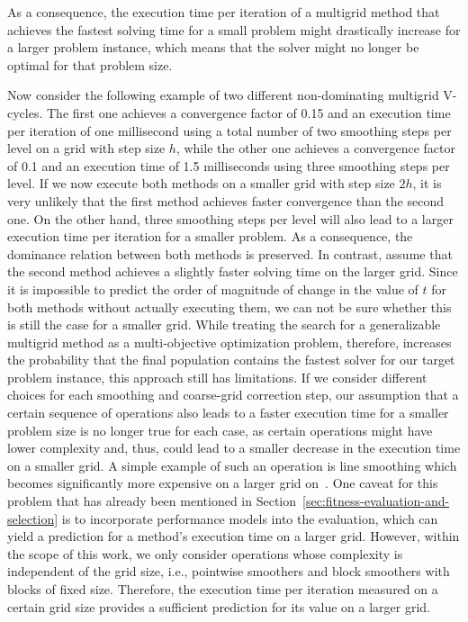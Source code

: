 As a consequence, the execution time per iteration of a multigrid method that achieves the fastest solving time for a small problem might drastically increase for a larger problem instance, which means that the solver might no longer be optimal for that problem size.

Now consider the following example of two different non-dominating multigrid V-cycles.
The first one achieves a convergence factor of 0.15 and an execution time per iteration of one millisecond using a total number of two smoothing steps per level on a grid with step size $h$, while the other one achieves a convergence factor of 0.1 and an execution time of 1.5 milliseconds using three smoothing steps per level.
If we now execute both methods on a smaller grid with step size $2h$, it is very unlikely that the first method achieves faster convergence than the second one.
On the other hand, three smoothing steps per level will also lead to a larger execution time per iteration for a smaller problem.
As a consequence, the dominance relation between both methods is preserved.
In contrast, assume that the second method achieves a slightly faster solving time on the larger grid.
Since it is impossible to predict the order of magnitude of change in the value of $t$ for both methods without actually executing them, we can not be sure whether this is still the case for a smaller grid.
While treating the search for a generalizable multigrid method as a multi-objective optimization problem, therefore, increases the probability that the final population contains the fastest solver for our target problem instance, this approach still has limitations.
If we consider different choices for each smoothing and coarse-grid correction step, our assumption that a certain sequence of operations also leads to a faster execution time for a smaller problem size is no longer true for each case, as certain operations might have lower complexity and, thus, could lead to a smaller decrease in the execution time on a smaller grid.
A simple example of such an operation is line smoothing which becomes significantly more expensive on a larger grid on~\cite{trottenberg2000multigrid}.
One caveat for this problem that has already been mentioned in Section~\ref{sec:fitness-evaluation-and-selection} is to incorporate performance models into the evaluation, which can yield a prediction for a method's execution time on a larger grid.
However, within the scope of this work, we only consider operations whose complexity is independent of the grid size, i.e., pointwise smoothers and block smoothers with blocks of fixed size. 
Therefore, the execution time per iteration measured on a certain grid size provides a sufficient prediction for its value on a larger grid.

